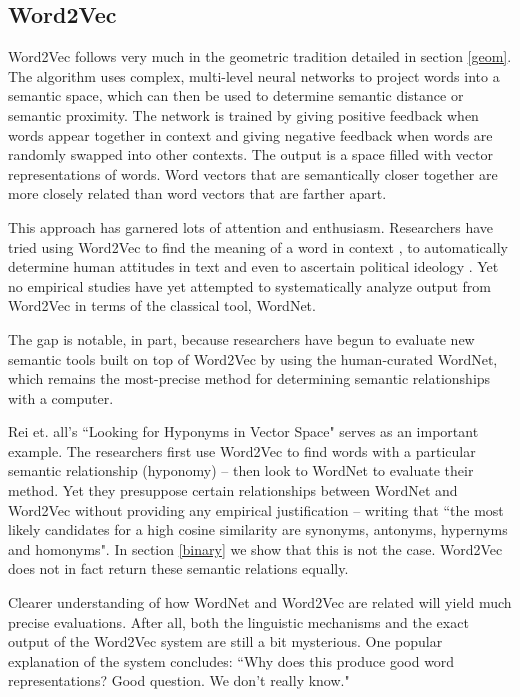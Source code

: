 \documentclass[titlepage]{article}
\begin{document}
\subsection{Word2Vec}

Word2Vec follows very much in the geometric tradition detailed in section \ref{geom}. The algorithm uses complex, multi-level neural networks to project words into a semantic space, which can then be used to determine semantic distance or semantic proximity. The network is trained by giving positive feedback when words appear together in context and giving negative feedback when words are randomly swapped into other contexts. The output is a space filled with vector representations of words. Word vectors that are semantically closer together are more closely related than word vectors that are farther apart. 

This approach has garnered lots of attention and enthusiasm. Researchers have tried using Word2Vec to find the meaning of a word in context \cite{wang2014introduction}, to automatically determine human attitudes in text \cite{xue2014study} and even to ascertain political ideology \cite{iyyerpolitical}. 
Yet no empirical studies have yet attempted to systematically analyze output from Word2Vec in terms of the classical tool, WordNet. 

The gap is notable, in part, because researchers have begun to evaluate new semantic tools built on top of Word2Vec by using the human-curated WordNet, which remains the most-precise method for determining semantic relationships with a computer.

Rei et. all's ``Looking for Hyponyms in Vector Space" serves as an important example. \cite{rei2014looking} The researchers first use Word2Vec to find words with a particular semantic relationship (hyponomy) -- then look to WordNet to evaluate their method. Yet they presuppose certain relationships between WordNet and Word2Vec without providing any empirical justification -- writing that ``the most likely candidates for a high cosine similarity are synonyms, antonyms, hypernyms and homonyms". In section \ref{binary} we show that this is not the case. Word2Vec does not in fact return these semantic relations equally. 

Clearer understanding of how WordNet and Word2Vec are related will yield much precise evaluations. After all, both the linguistic mechanisms and the exact output of the Word2Vec system are still a bit mysterious. One popular explanation of the system concludes: ``Why does this produce good word representations? Good question. We don’t really know." \cite{goldberg2014word2vec}
\end{document}
